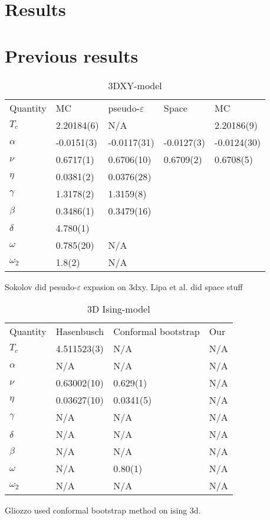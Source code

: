 %

\section{Results}
\section{Previous results}
\begin{table}[!htpb]
\begin{center}
\begin{tabular}{l l l l l}
  Quantity 	& MC\cite{Campostrini2006} 	& pseudo-$\varepsilon$\cite{Sokolov2016} & Space\cite{Lipa2003}	& MC\cite{Jeon2012} \\
  $T_c$		& 2.20184(6)			& N/A					&			& 2.20186(9)\\
  $\alpha $	& -0.0151(3)			& -0.0117(31)				&-0.0127(3)		& -0.0124(30)\\
  $\nu	  $     & 0.6717(1) 			& 0.6706(10)				&0.6709(2)		& 0.6708(5)\\
  $\eta   $     & 0.0381(2) 			& 0.0376(28) 				&			& \\
  $\gamma $	& 1.3178(2) 			& 1.3159(8)				&			& \\
  $\beta  $     & 0.3486(1) 			& 0.3479(16)				&			& \\
  $\delta $	& 4.780(1) 			& 					&			& \\
  $\omega $     & 0.785(20) 			& N/A					&			& \\
  $\omega_2$ 	& 1.8(2) 			& N/A					&			& \\
\end{tabular}
\end{center}
\caption{3DXY-model }
\end{table}
Sokolov did pesudo-$\varepsilon$ expasion on 3dxy.\cite{Sokolov2016}
Lipa et al. did space stuff \cite{Lipa2003}
\begin{table}[!htpb]
\begin{center}
\begin{tabular}{l l l l}
  Quantity  & Hasenbusch & Conformal bootstrap& Our\\
  $T_c$	    & 4.511523(3)& N/A		& N/A\\
  $\alpha $ & N/A        & N/A		& N/A\\
  $\nu	  $ & 0.63002(10)& 0.629(1)	& N/A\\
  $\eta   $ & 0.03627(10)& 0.0341(5)	& N/A\\
  $\gamma $ & N/A        & N/A		& N/A\\
  $\delta $ & N/A        & N/A		& N/A\\
  $\beta  $ & N/A        & N/A		& N/A\\
  $\omega $ & N/A        & 0.80(1)	& N/A\\
  $\omega_2$& N/A        & N/A		& N/A\\
\end{tabular}
\end{center}
\caption{3D Ising-model }
\end{table}
Gliozzo used conformal bootstrap method on ising 3d.\cite{Gliozzi2014}
